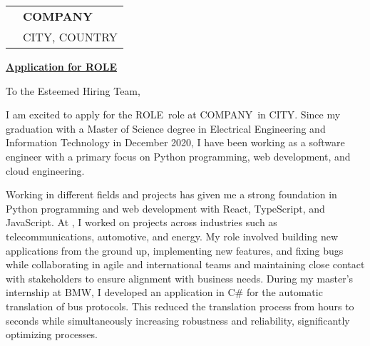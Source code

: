 \documentclass[10pt, a4paper]{article}
\begin{document}
\vspace{2.5cm}
\bigskip
\bigskip


\newcommand{\COMPANY}{COMPANY}
\newcommand{\ROLE}{ROLE}
\newcommand{\CITY}{CITY}
\newcommand{\COUNTRY}{COUNTRY}

\begin{tabular}{@{}p{0cm}l@{}} 
 & \textbf{\COMPANY} \\[0.8ex] 
 & \CITY, \COUNTRY
\end{tabular}

\bigskip %

\hfill {}

\noindent \textbf{\underline{Application for \ROLE}}

To the Esteemed Hiring Team,
\bigskip

I am excited to apply for the \ROLE\ role at \COMPANY\ in \CITY. Since my graduation with a Master of Science degree in Electrical Engineering and Information Technology in December 2020, I have been working as a software engineer with a primary focus on Python programming, web development, and cloud engineering.

Working in different fields and projects has given me a strong foundation in Python programming and web development with React, TypeScript, and JavaScript. At \companynow, I worked on projects across industries such as telecommunications, automotive, and energy. My role involved building new applications from the ground up, implementing new features, and fixing bugs while collaborating in agile and international teams and maintaining close contact with stakeholders to ensure alignment with business needs. During my master's internship at BMW, I developed an application in C\# for the automatic translation of bus protocols. This reduced the translation process from hours to seconds while simultaneously increasing robustness and reliability, significantly optimizing processes.
\end{document}
